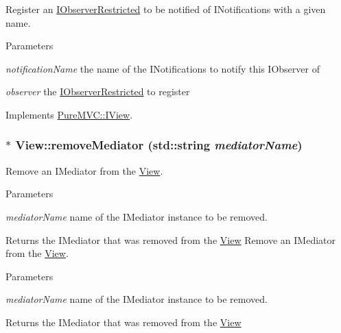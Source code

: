 Register an {\ttfamily \hyperlink{class_pure_m_v_c_1_1_i_observer_restricted}{IObserverRestricted}} to be notified of {\ttfamily INotifications} with a given name. 
\begin{DoxyParams}{Parameters}
\item[{\em notificationName}]the name of the {\ttfamily INotifications} to notify this {\ttfamily IObserver} of \item[{\em observer}]the {\ttfamily \hyperlink{class_pure_m_v_c_1_1_i_observer_restricted}{IObserverRestricted}} to register \end{DoxyParams}


Implements \hyperlink{class_pure_m_v_c_1_1_i_view_a20f6f6e91366a0efc193a70944249830}{PureMVC::IView}.\hypertarget{class_pure_m_v_c_1_1_view_a015fe15ee362685fdb72584019417b5d}{
\subsubsection[{removeMediator}]{ $\ast$ View::removeMediator (std::string {\em mediatorName})}}
\label{class_pure_m_v_c_1_1_view_a015fe15ee362685fdb72584019417b5d}


Remove an {\ttfamily IMediator} from the {\ttfamily \hyperlink{class_pure_m_v_c_1_1_view}{View}}. 
\begin{DoxyParams}{Parameters}
\item[{\em mediatorName}]name of the {\ttfamily IMediator} instance to be removed. \end{DoxyParams}
\begin{DoxyReturn}{Returns}
the {\ttfamily IMediator} that was removed from the {\ttfamily \hyperlink{class_pure_m_v_c_1_1_view}{View}} Remove an {\ttfamily IMediator} from the {\ttfamily \hyperlink{class_pure_m_v_c_1_1_view}{View}}.
\end{DoxyReturn}

\begin{DoxyParams}{Parameters}
\item[{\em mediatorName}]name of the {\ttfamily IMediator} instance to be removed. \end{DoxyParams}
\begin{DoxyReturn}{Returns}
the {\ttfamily IMediator} that was removed from the {\ttfamily \hyperlink{class_pure_m_v_c_1_1_view}{View}} 
\end{DoxyReturn}



